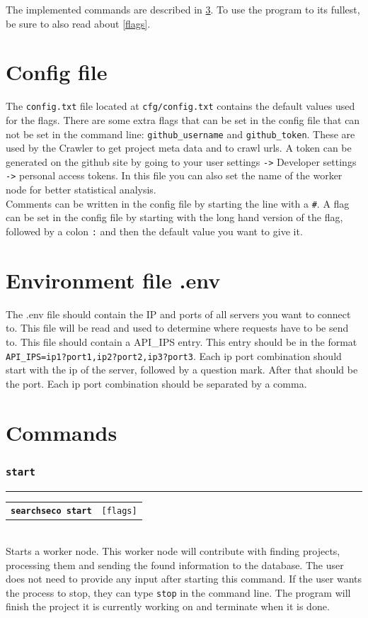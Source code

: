 \documentclass{article}
\begin{document}
The implemented commands are described in \cref{cmds}. To use the program to its fullest, be sure to also read about \cref{flags}. 

\section{Config file}
The \texttt{config.txt} file located at \texttt{cfg/config.txt} contains the default values used for the flags. There are some extra flags that can be set in the config file that can not be set in the command line: \texttt{github\_username} and \texttt{github\_token}. These are used by the Crawler to get project meta data and to crawl urls. A token can be generated on the github site by going to your user settings \texttt{->} Developer settings \texttt{->} personal access tokens. In this file you can also set the name of the worker node for better statistical analysis.\\
Comments can be written in the config file by starting the line with a \texttt{\#}. A flag can be set in the config file by starting with the long hand version of the flag, followed by a colon \texttt{:} and then the default value you want to give it.

\section{Environment file .env}
The .env file should contain the IP and ports of all servers you want to connect to. This file will be read and used to determine where requests have to be send to. This file should contain a API\_IPS entry. This entry should be in the format \texttt{API\_IPS=ip1?port1,ip2?port2,ip3?port3}. Each ip port combination should start with the ip of the server, followed by a question mark. After that should be the port. Each ip port combination should be separated by a comma.


\clearpage
\section{Commands}
\label{cmds}
\subsubsection*{\texttt{start }} 
\rule{\linewidth}{0.5pt} \vspace{.1cm}

\begin{tabularx}{\textwidth}{lX}
    \texttt{\textbf{searchseco start}} & \texttt{[flags]}
\end{tabularx} 
\vspace{.15cm} \\
Starts a worker node. This worker node will contribute with finding projects, processing them and sending the found information to the database. The user does not need to provide any input after starting this command. If the user wants the process to stop, they can type \texttt{stop} in the command line. The program will finish the project it is currently working on and terminate when it is done.\par
\end{document}
